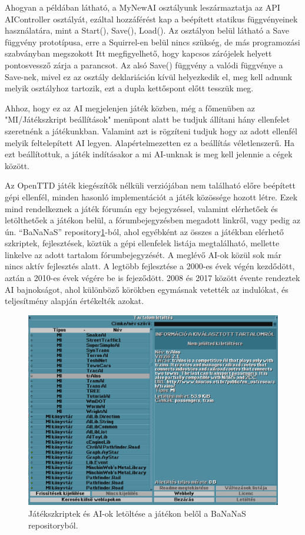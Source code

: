 Ahogyan a példában látható, a MyNewAI osztályunk leszármaztatja az API AIController osztályát, ezáltal hozzáférést kap a beépített statikus függvényeinek használatára, mint a Start(), Save(), Load(). Az osztályon belül látható a Save függvény prototípusa, erre a Squirrel-en belül nincs szükség, de más programozási szabványban megszokott Itt megfigyelhető, hogy kapcsos zárójelek helyett pontosvessző zárja a parancsot. Az alsó Save() függvény a valódi függvénye a Save-nek, mivel ez az osztály deklariáción kívül helyezkedik el, meg kell adnunk melyik osztályhoz tartozik, ezt a dupla kettőspont előtt tesszük meg.

Ahhoz, hogy ez az AI megjelenjen játék közben, még a főmenüben az "MI/Játékszkript beállítások" menüpont alatt be tudjuk állítani hány ellenfelet szeretnénk a játékunkban. Valamint azt is rögzíteni tudjuk hogy az adott ellenfél melyik feltelepített AI legyen. Alapértelmezetten ez a beállítás véletlenszerű. Ha ezt beállítottuk, a játék indításakor a mi AI-unknak is meg kell jelennie a cégek között.


Az OpenTTD játék kiegészítők nélküli verziójában nem található előre beépített gépi ellenfél, minden hasonló implementációt a játék közössége hozott létre. Ezek mind rendelkeznek a játék fórumán egy bejegyzéssel, valamint elérhetőek és letölthetőek a játékon belül, a fórumbejegyzésben megadott linkről, vagy pedig az ún. “BaNaNaS” repository\ref{fig:bananas}-ból, ahol egyébként az összes a játékban elérhető szkriptek, fejlesztések, köztük a gépi ellenfelek listája megtalálható, mellette linkelve az adott tartalom fórumbejegyzését. A meglévő AI-ok közül sok már nincs aktív fejlesztés alatt. A legtöbb fejlesztése a 2000-es évek végén kezdődött, aztán a 2010-es évek végére be is fejeződött. 2008 és 2017 között évente rendeztek AI bajnokságot, ahol különböző körökben egymásnak vetették az indulókat, és teljesítmény alapján értékelték azokat.

\begin{figure}
	\centering
	\includegraphics[scale=0.4]{images/bananas.png}
	\caption{Játékszkriptek és AI-ok letöltése a játékon belől a BaNaNaS repositoryból.}
	\label{fig:bananas}
\end{figure}

